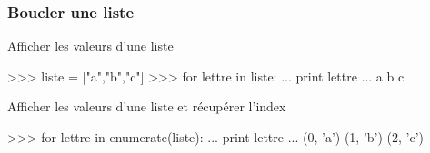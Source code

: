 \begin{frame}[fragile]
\frametitle{Boucler une liste}

\begin{minipage}[t]{0.38\linewidth}
Afficher les valeurs d'une liste
\end{minipage}\hfill
\begin{minipage}[t]{0.58\linewidth}
\vspace{-0.5cm}
\begin{GrayBox}[0.85\textwidth]
\begin{verbatimtab}[3]
>>> liste = ["a","b","c"]
>>> for lettre in liste:
...     print lettre
... 
a
b
c
\end{verbatimtab}
\end{GrayBox}
\end{minipage}

\begin{minipage}[t]{0.38\linewidth}
Afficher les valeurs d'une liste et récupérer l'index
\end{minipage}\hfill
\begin{minipage}[t]{0.58\linewidth}
\vspace{-0.5cm}
\begin{GrayBox}[0.85\textwidth]
\begin{verbatimtab}[3]
>>> for lettre in enumerate(liste):
...     print lettre
... 
(0, 'a')
(1, 'b')
(2, 'c')
\end{verbatimtab}
\end{GrayBox}
\end{minipage}
\end{frame}

